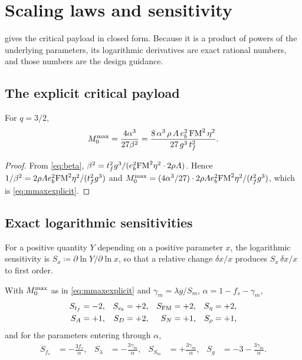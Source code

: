 ﻿\section{Scaling laws and sensitivity}
\label{sec:scaling}

 gives the critical payload in closed form. Because it is
a product of powers of the underlying parameters, its logarithmic derivatives
are exact rational numbers, and those numbers are the design guidance.

\subsection{The explicit critical payload}

\begin{proposition}
\label{prop:mmaxexplicit}
For $q=3/2$,
\begin{equation}
  M_0^{\max}
  = \frac{4\alpha^{3}}{27\beta^{2}}
  = \frac{8\,\alpha^{3}\,\rho\, A\, e_b^{2}\,\mathrm{FM}^{2}\,\eta^{2}}
         {27\, g^{3}\, t_f^{2}} .
  \label{eq:mmaxexplicit}
\end{equation}
\end{proposition}

\begin{proof}
From \cref{eq:beta}, $\beta^2 = t_f^2 g^3/(e_b^2\mathrm{FM}^2\eta^2\cdot 2\rho A)$.
Hence $1/\beta^2 = 2\rho A e_b^2\mathrm{FM}^2\eta^2/(t_f^2 g^3)$ and
$M_0^{\max} = (4\alpha^3/27)\cdot 2\rho Ae_b^2\mathrm{FM}^2\eta^2/(t_f^2g^3)$, which is
\cref{eq:mmaxexplicit}.
\end{proof}

\subsection{Exact logarithmic sensitivities}

\begin{definition}
For a positive quantity $Y$ depending on a positive parameter $x$, the
logarithmic sensitivity is
$S_x \coloneqq \partial \ln Y/\partial \ln x$, so that a relative change
$\delta x/x$ produces $S_x\,\delta x/x$ to first order.
\end{definition}

\begin{theorem}
\label{thm:sensitivity}
With $M_0^{\max}$ as in \cref{eq:mmaxexplicit} and
$\gamma_m = \lambda g/S_m$, $\alpha = 1-f_s-\gamma_m$,
\begin{align}
  S_{t_f} &= -2, &
  S_{e_b} &= +2, &
  S_{\mathrm{FM}} &= +2, &
  S_{\eta} &= +2, \label{eq:sens1}\\
  S_{A} &= +1, &
  S_{D} &= +2, &
  S_{N} &= +1, &
  S_{\rho} &= +1, \label{eq:sens2}
\end{align}
and for the parameters entering through $\alpha$,
\begin{align}
  S_{f_s} &= -\frac{3 f_s}{\alpha}, &
  S_{\lambda} &= -\frac{3\gamma_m}{\alpha}, &
  S_{S_m} &= +\frac{3\gamma_m}{\alpha}, &
  S_{g} &= -3 - \frac{3\gamma_m}{\alpha} . \label{eq:sens3}
\end{align}
\end{theorem}

